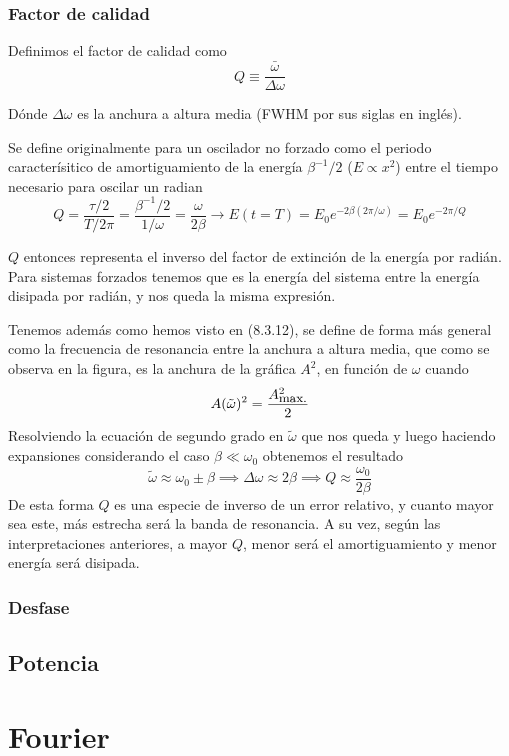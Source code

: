 \subsubsection{Factor de calidad}
Definimos el factor de calidad como
\begin{equation} \label{6.1.1}
    Q \equiv  \frac{\bar{\omega}}{\Delta \omega}
\end{equation}

Dónde $\Delta \omega$ es la anchura a altura media (FWHM por sus siglas en inglés).

Se define originalmente para un oscilador no forzado como el periodo caracterísitico de amortiguamiento de la energía $\beta^{-1}/2$ ($E \propto x^2$) entre el tiempo necesario para oscilar un radian
\begin{equation} \label{6.1.1}
    Q = \frac{\tau / 2}{T/ 2\pi} = \frac{\beta^{-1}/2}{1/\omega} = \frac{\omega}{2\beta} \rightarrow E (t = T) = E_0 e^{-2 \beta (2\pi/\omega)} = E_0 e^{-2\pi/Q}
\end{equation}
$Q$ entonces representa el inverso del factor de extinción de la energía \newline por radián. Para sistemas forzados tenemos que es la energía del sistema \newline entre  la energía disipada por radián, y nos queda la misma expresión.

Tenemos además como hemos visto en (8.3.12), se define de forma más general \newline como la frecuencia de resonancia entre la anchura a altura media, que como se observa en la figura, es la anchura de la gráfica $A^2$, en función de $\omega$ cuando 
\begin{equation} \label{6.1.1}
    A(\tilde{\omega})^2 = \frac{A^2_{\mbox{\small max.}}}{2}
\end{equation}
Resolviendo la ecuación de segundo grado en $\tilde{\omega}$ que nos queda y luego haciendo expansiones considerando el caso $\beta \ll \omega_0$ obtenemos el resultado
\begin{equation} \label{6.1.1}
    \tilde{\omega} \approx \omega_0 \pm \beta \implies \Delta \omega \approx 2\beta \implies Q \approx \frac{\omega_0}{2\beta}
\end{equation}
De esta forma $Q$ es una especie de inverso de un error relativo, y cuanto mayor sea este, más estrecha será la banda de resonancia. A su vez, según las interpretaciones anteriores, a mayor $Q$, menor será el amortiguamiento y menor energía será disipada.
\subsubsection{Desfase}
\subsection{Potencia}
\section{Fourier}
